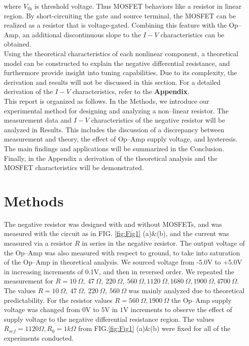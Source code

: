 \documentclass[%
 aip,
amsmath,amssymb,
reprint,
]{revtex4-1}
\begin{document}
\noindent where $V_{\textrm{th}}$ is threshold voltage. Thus MOSFET behaviors like a resistor in linear region. By short-circuiting the gate and source terminal, the MOSFET can be realized as a resistor that is voltage-gated. Combining this feature with the Op--Amp, an additional discontinuous slope to the $I-V$ characteristics can be obtained.\\

Using the theoretical characteristics of each nonlinear component, a theoretical model can be constructed to explain the negative differential resistance, and furthermore provide insight into tuning capabilities. Due to its complexity, the derivation and results will not be discussed in this section. For a detailed derivation of the $I-V$ characteristics, refer to the \textbf{Appendix}.\\


This report is organized as follows. In the Methods, we introduce our experimental method for designing and analyzing a non--linear resistor. The measurement data and $I-V$ characteristics of the negative resistor will be analyzed in Results. This includes the discussion of a discrepancy between measurement and theory, the effect of Op--Amp supply voltage, and hysteresis. The main findings and applications will be summarized in the Conclusion. Finally, in the Appendix a derivation of the theoretical analysis and the MOSFET characteristics will be demonstrated. 

\section{\label{sec:Method} Methods}

The negative resistor was designed with and without MOSFETs, and was measured with the circuit as in FIG. \ref{fig:Fig1} (a)\&(b), and the current was measured via a resistor $R$ in series in the negative resistor. The output voltage of the Op--Amp was also measured with respect to ground, to take into saturation of the Op--Amp in theoretical analysis. We sourced voltage from -5.0V to +5.0V in increasing increments of 0.1V, and then in reversed order. We repeated the measurement for $R=10\>\Omega,\>47\>\Omega,\>220\>\Omega,\>560\>\Omega,1120\>\Omega, 1680\>\Omega,1900\>\Omega,4700\>\Omega$. The values $R=10\>\Omega,\>47\>\Omega,\>220\>\Omega,\>560\>\Omega$ was mainly analyzed due to theoretical predictability. For the resistor values $R=560\>\Omega,1900\>\Omega$ the Op--Amp supply voltage was changed from $0$V to $5$V in $1$V increments to observe the effect of supply voltage to the negative differential resistance region. The values $R_{ref} = 1120\Omega, R_0 = 1k\Omega$ from FIG.\ref{fig:Fig1} (a)\&(b) were fixed for all of the experiments conducted.
\end{document}
